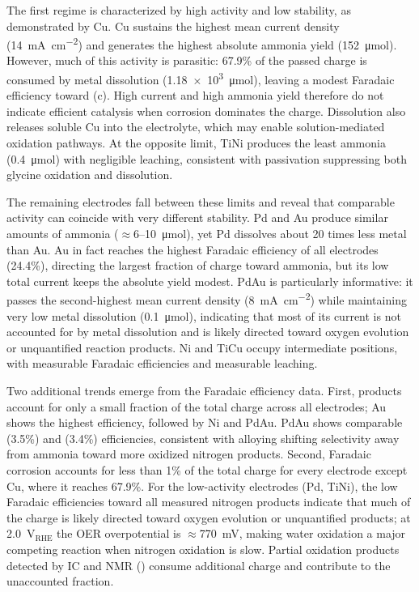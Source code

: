\documentclass[twoside,twocolumn,9pt]{article}
\begin{document}
The first regime is characterized by high activity and low stability, as demonstrated by Cu. Cu sustains the highest mean current density (\SI{14}{\milli\ampere\per\square\centi\meter}) and generates the highest absolute ammonia yield (152~\si{\micro mol}). However, much of this activity is parasitic: 67.9\% of the passed charge is consumed by metal dissolution (\num{1.18e3}~\si{\micro mol}), leaving a modest Faradaic efficiency toward  (c). High current and high ammonia yield therefore do not indicate efficient catalysis when corrosion dominates the charge. Dissolution also releases soluble Cu into the electrolyte, which may enable solution-mediated oxidation pathways.  At the opposite limit, TiNi produces the least ammonia (0.4~\si{\micro mol}) with negligible leaching, consistent with passivation suppressing both glycine oxidation and dissolution.

The remaining electrodes fall between these limits and reveal that comparable activity can coincide with very different stability. Pd and Au produce similar amounts of ammonia ($\approx$6--10~\si{\micro mol}), yet Pd dissolves about 20 times less metal than Au. Au in fact reaches the highest  Faradaic efficiency of all electrodes (24.4\%), directing the largest fraction of charge toward ammonia, but its low total current keeps the absolute yield modest. PdAu is particularly informative: it passes the second-highest mean current density (\SI{8}{\milli\ampere\per\square\centi\meter}) while maintaining very low metal dissolution (0.1~\si{\micro mol}), indicating that most of its current is not accounted for by metal dissolution and is likely directed toward oxygen evolution or unquantified reaction products. Ni and TiCu occupy intermediate positions, with measurable  Faradaic efficiencies and measurable leaching.

Two additional trends emerge from the Faradaic efficiency data. First,  products account for only a small fraction of the total charge across all electrodes; Au shows the highest  efficiency, followed by Ni and PdAu. PdAu shows comparable  (3.5\%) and  (3.4\%) efficiencies, consistent with alloying shifting selectivity away from ammonia toward more oxidized nitrogen products. Second, Faradaic corrosion accounts for less than 1\% of the total charge for every electrode except Cu, where it reaches 67.9\%. For the low-activity electrodes (Pd, TiNi), the low Faradaic efficiencies toward all measured nitrogen products indicate that much of the charge is likely directed toward oxygen evolution or unquantified products; at 2.0~V$_{\mathrm{RHE}}$ the OER overpotential is $\approx$770~mV, making water oxidation a major competing reaction when nitrogen oxidation is slow. Partial oxidation products detected by IC and NMR () consume additional charge and contribute to the unaccounted fraction.
\end{document}
